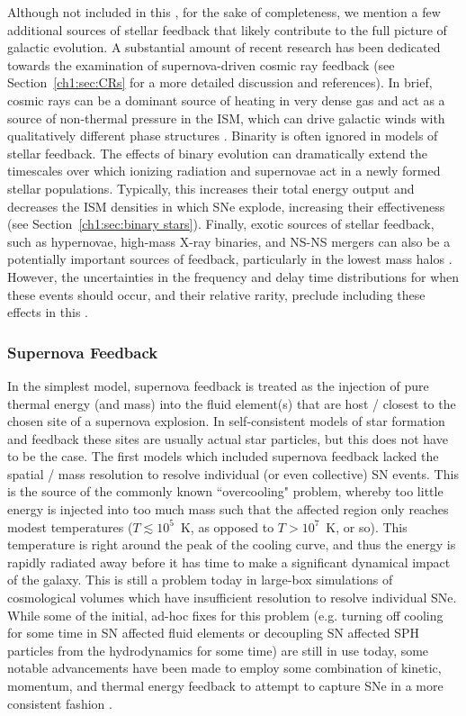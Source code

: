 Although not included in this \dissertation, for the sake of completeness, we mention a few additional sources of stellar feedback that likely contribute to the full picture of galactic evolution. A substantial amount of recent research has been dedicated towards the examination of supernova-driven cosmic ray feedback (see Section~\ref{ch1:sec:CRs} for a more detailed discussion and references). In brief, cosmic rays can be a dominant source of heating in very dense gas and act as a source of non-thermal pressure in the ISM, which can drive galactic winds with qualitatively different phase structures \citep[e.g.][]{SalemBryanCorlies}. Binarity is often ignored in models of stellar feedback. The effects of binary evolution can dramatically extend the timescales over which ionizing radiation and supernovae act in a newly formed stellar populations. Typically, this increases their total energy output and decreases the ISM densities in which SNe explode, increasing their effectiveness (see Section~\ref{ch1:sec:binary stars}). Finally, exotic sources of stellar feedback, such as hypernovae, high-mass X-ray binaries, and NS-NS mergers can also be a potentially important sources of feedback, particularly in the lowest mass halos \citep[e.g.][]{Artale2015}. However, the uncertainties in the frequency and delay time distributions for when these events should occur, and their relative rarity, preclude including these effects in this \dissertation.

\subsubsection{Supernova Feedback}
\label{intro:sec:supernovae}

In the simplest model, supernova feedback is treated as the injection of pure thermal energy (and mass) into the fluid element(s) that are host / closest to the chosen site of a supernova explosion. In self-consistent models of star formation and feedback these sites are usually actual star particles, but this does not have to be the case. The first models which included supernova feedback lacked the spatial / mass resolution to resolve individual (or even collective) SN events. This is the source of the commonly known ``overcooling" problem, whereby too little energy is injected into too much mass such that the affected region only reaches modest temperatures ($T \lesssim 10^5$~K, as opposed to $T > 10^7$~K, or so). This temperature is right around the peak of the cooling curve, and thus the energy is rapidly radiated away before it has time to make a significant dynamical impact of the galaxy. This is still a problem today in large-box simulations of cosmological volumes which have insufficient resolution to resolve individual SNe. While some of the initial, ad-hoc fixes for this problem (e.g. turning off cooling for some time in SN affected fluid elements or decoupling SN affected SPH particles from the hydrodynamics for some time) are still in use today, some notable advancements have been made to employ some combination of kinetic, momentum, and thermal energy feedback to attempt to capture SNe in a more consistent fashion \citep[e.g.][]{FIRE,Simpson2015,Hopkins2018}.

